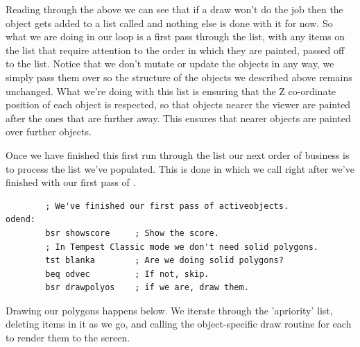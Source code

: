 Reading through the above we can see that if a  draw won't do the job then the object gets
added to a list called  and nothing else is done with it for now. So what we are doing in our
 loop is a first pass through the  list, with any items on the list that 
require attention to the order in which they are painted, passed off to the  list. Notice
that we don't mutate or update the objects in any way, we simply pass them over so the structure of the objects
we described above remains unchanged. What we're doing with this list is ensuring that the Z co-ordinate position
of each object is respected, so that objects nearer the viewer are painted after the ones that are further away. This
ensures that nearer objects are painted over further objects.

Once we have finished this first run through the  list our next order of business
is to process the  list we've populated. This is done in  which we
call right after we've finished with our first pass of . 
\clearpage
\begin{lstlisting}
        ; We've finished our first pass of activeobjects.
odend:
        bsr showscore     ; Show the score.
        ; In Tempest Classic mode we don't need solid polygons.
        tst blanka        ; Are we doing solid polygons?
        beq odvec         ; If not, skip.
        bsr drawpolyos    ; if we are, draw them.
\end{lstlisting}

Drawing our polygons happens below. We iterate through the 'apriority' list, deleting items in it
as we go, and calling the object-specific draw routine for each to render them to the screen.


